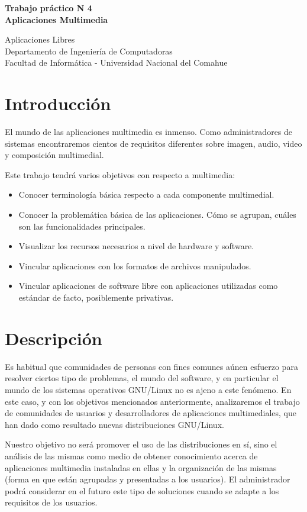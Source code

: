 \documentclass[12pt]{article}
\def\maketitle{

 \makeatletter
 {\color{bl} \centering \huge \sc \textbf{
Trabajo práctico N 4 \\
\large \vspace*{-8pt} \color{black} Aplicaciones Multimedia 
 \vspace*{8pt} }\par}
 \makeatother


 \makeatletter
 {\centering \small 
	Aplicaciones Libres\\
 	Departamento de Ingeniería de Computadoras \\
 	Facultad de Informática - Universidad Nacional del Comahue \\
 	\vspace{20pt} }
 \makeatother

}
\begin{document}
\thispagestyle{empty}
\maketitle
\setlength{\parindent}{0pt}


\section*{Introducción}
El mundo de las aplicaciones multimedia es inmenso. Como administradores de 
sistemas encontraremos cientos de requisitos diferentes sobre imagen, audio, 
video y composición multimedial. 

Este trabajo tendrá varios objetivos con respecto a multimedia:
\begin{itemize} 
\item Conocer terminología básica respecto a cada componente multimedial. 
\item Conocer la problemática básica de las aplicaciones. Cómo se agrupan, cuáles
son las funcionalidades principales. 
\item Visualizar los recursos necesarios a nivel de hardware y software.
\item Vincular aplicaciones con los formatos de archivos manipulados. 
\item Vincular aplicaciones de software libre con aplicaciones utilizadas 
como estándar de facto, posiblemente privativas. 
\end{itemize}

\section*{Descripción}
Es habitual que comunidades de personas con fines comunes aúnen esfuerzo para 
resolver ciertos tipo de problemas, el mundo del software, y en particular el 
mundo de los sistemas operativos GNU/Linux no es ajeno a este fenómeno. En 
este caso, y con los objetivos mencionados anteriormente, analizaremos el 
trabajo de comunidades de usuarios y desarrolladores de aplicaciones 
multimediales, que han dado como resultado nuevas distribuciones GNU/Linux.  

Nuestro objetivo no será promover el uso de las distribuciones en sí, sino el 
análisis de las mismas como medio de obtener conocimiento acerca de 
aplicaciones multimedia instaladas en ellas y la organización de las 
mismas (forma en que están agrupadas y presentadas a los usuarios). El 
administrador podrá considerar en el futuro este tipo de soluciones cuando 
se adapte a los requisitos de los usuarios.  
\end{document}
